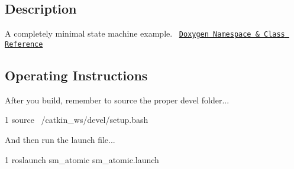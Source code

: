 \subsection*{Description}

A completely minimal state machine example.~\newline
 \href{https://reelrbtx.github.io/SMACC/master/html/namespacesm__atomic.html}{\tt Doxygen Namespace \& Class Reference} \subsection*{Operating Instructions}

After you build, remember to source the proper devel folder...


\begin{DoxyCode}
1 source ~/catkin\_ws/devel/setup.bash
\end{DoxyCode}


And then run the launch file...


\begin{DoxyCode}
1 roslaunch sm\_atomic sm\_atomic.launch
\end{DoxyCode}
 